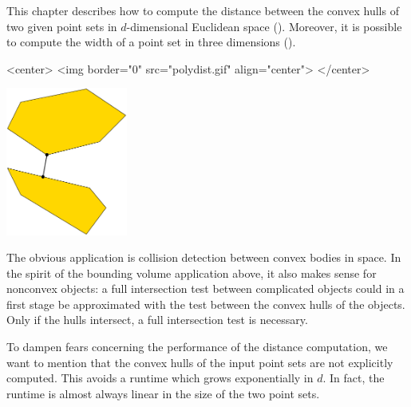 

This chapter describes how to compute the distance between the convex
hulls of two given point sets in $d$-dimensional Euclidean space
(). Moreover, it is possible to
compute the width of a point set in three dimensions
().

\begin{ccHtmlOnly}
<center>
<img border="0" src="polydist.gif" align="center">
</center>
\end{ccHtmlOnly} 

\begin{ccTexOnly}
\begin{center}
\includegraphics[width=4cm]{Polytope_distance_d/polydist}
\end{center}
\end{ccTexOnly}

The obvious application is collision detection between convex bodies
in space. In the spirit of the bounding volume application above, it
also makes sense for nonconvex objects: a full intersection test
between complicated objects could in a first stage be approximated
with the test between the convex hulls of the objects. Only if the
hulls intersect, a full intersection test is necessary.

To dampen fears concerning the performance of the distance
computation, we want to mention that the convex hulls of the input
point sets are not explicitly computed. This avoids a runtime which
grows exponentially in $d$. In fact, the runtime is almost always
linear in the size of the two point sets.

